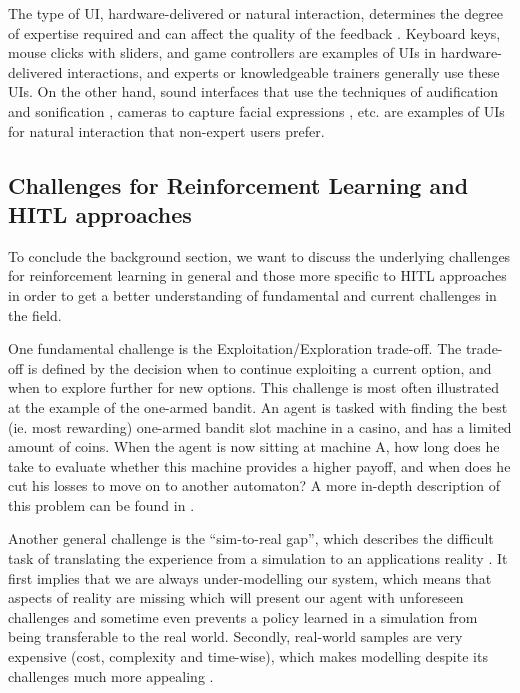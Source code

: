 \documentclass[twoside,11pt]{article}
\begin{document}
The type of UI, hardware-delivered or natural interaction,  determines the degree of expertise required and can affect the quality of the feedback \citep{lin:20}. Keyboard keys, mouse clicks with sliders, and game controllers are examples of UIs in hardware-delivered interactions, and experts or knowledgeable trainers generally use these UIs. On the other hand, sound interfaces that use the techniques of audification and sonification \citep{Hermann:2011:Sonification,kartoun:10, Saranti:2009,Scurto:2021:DesigningDeepRLHumanParameterExploration}, cameras to capture facial expressions \citep{arakawa:18}, etc. are examples of UIs for natural interaction that non-expert users prefer. 

\subsection{Challenges for Reinforcement Learning and HITL approaches} 
\label{sec:ChallengesRL}

To conclude the background section, we want to discuss the underlying challenges for reinforcement learning in general and those more specific to HITL approaches in order to get a better understanding of fundamental and current challenges in the field.

One fundamental challenge is the Exploitation/Exploration trade-off. The trade-off is defined by the decision when to continue exploiting a current option, and when to explore further for new options. This challenge is most often illustrated at the example of the one-armed bandit. An agent is tasked with finding the best (ie. most rewarding) one-armed bandit slot machine in a casino, and has a limited amount of coins. When the agent is now sitting at machine A, how long does he take to evaluate whether this machine provides a higher payoff, and when does he cut his losses to move on to another automaton? A more in-depth description of this problem can be found in \citet{AudibertMunosSzepesv:2009:ExplorationExploitation}.

Another general challenge is the ``sim-to-real gap'', which describes the difficult task of translating the experience from a simulation to an applications reality \citep{ZagalJavierVallejos:2004:RealityGap}. It first implies that we are always under-modelling our system, which means that aspects of reality are missing which will present our agent with unforeseen challenges and sometime even prevents a policy learned in a simulation from being transferable to the real world. Secondly, real-world samples are very expensive (cost, complexity and time-wise), which makes modelling despite its challenges much more appealing  \citep{KoberBagnellPeters:2013:RLRoboticsSurvey}.
\end{document}

